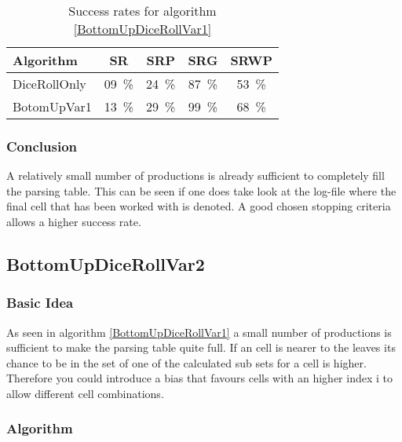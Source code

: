 \begin{table}[H]
	\centering
	\begin{tabular}{ | l || c |c |c |c | }
	\hline
	Algorithm 		& SR 	& SRP 	& SRG 	& SRWP   	\\ \hline
	\hline
	DiceRollOnly 	& 09~\%	& 24~\% & 87~\% & 53~\%		\\ \hline
	BotomUpVar1 	& 13~\% & 29~\% & 99~\% & 68~\% 	\\ \hline
	\end{tabular}
	\caption{Success rates for algorithm \ref{BottomUpDiceRollVar1}}
	\label{BottomUpDiceRollVar1SR}
\end{table}

\subsubsection{Conclusion}
A relatively small number of productions is already sufficient to completely fill the parsing table. This can be seen if one does take look at the log-file where the final cell that has been worked with is denoted.
A good chosen stopping criteria allows a higher success rate.

\pagebreak
\subsection{BottomUpDiceRollVar2}
\subsubsection{Basic Idea} 
As seen in algorithm \ref{BottomUpDiceRollVar1} a small number of productions is sufficient to make the parsing table quite full. If an cell is nearer to the leaves its chance to be in the set of one of the calculated sub sets for a cell is higher. Therefore you could introduce a bias that favours cells with an higher index i to allow different cell combinations.

\subsubsection{Algorithm}

